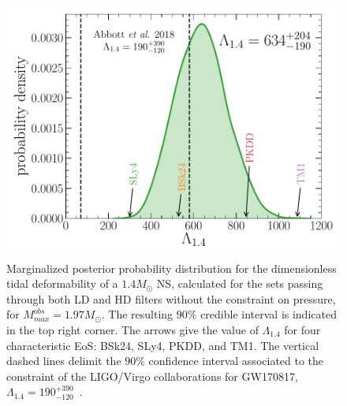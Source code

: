\begin{figure}[!t]
  \begin{center}
    \includegraphics[width=0.9\linewidth]{figures/lambda14_bayes.pdf}
  \end{center}
  \caption[Marginalized posterior probability distribution for the 
  dimensionless tidal deformability of a $1.4M_\odot$ neutron star]{
    Marginalized posterior probability distribution for the
    dimensionless tidal deformability of a $1.4M_\odot$ NS, calculated for the 
    sets passing through both LD and HD filters without the constraint on 
    pressure, for $M_{max}^{obs}=1.97M_\odot$. The resulting $90\%$ credible 
    interval is indicated in the top right corner. The arrows give the value of 
    $\Lambda_{1.4}$ for four characteristic EoS: BSk24, SLy4, PKDD, and TM1. 
    The vertical dashed lines delimit the $90\%$ confidence interval associated 
    to the constraint of the LIGO/Virgo collaborations for GW170817, 
  $\Lambda_{1.4}=190_{-120}^{+390}$~\cite{GW1}.}\label{fig:lambda14_bayes}
\end{figure}


